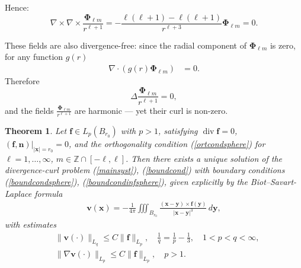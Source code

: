 \documentclass[a4paper]{article}
\newcommand{\Z}{\mathbb{Z}}
\newcommand{\bx}{\mathbf{x}}
\newcommand{\bff}{\mathbf{f}}
\newcommand{\divv}{\operatorname{div}}
\newcommand{\bv}{\mathbf{v}}
\newcommand{\by}{\mathbf{y}}
\newcommand{\bn}{\mathbf{n}}
\newtheorem{theorem}{Theorem}[section]
\begin{document}
Hence:
$$
\nabla \times \nabla \times \frac{\mathbf \Phi_{\ell m}}{r^{\ell+1}} = -\frac{\ell(\ell+1) - \ell(\ell+1)}{r^{\ell+3}}\mathbf \Phi_{\ell m}  = 0.
$$

These fields are also divergence-free: since the radial component of $\mathbf{\Phi}_{\ell m}$ is zero, for any function $g(r)$
\begin{align*}
\nabla \cdot \left(g(r){\mathbf\Phi } _{\ell m}\right)&=0.
\end{align*}
Therefore
$$
\Delta \frac{\mathbf \Phi_{\ell m}}{r^{\ell+1}} = 0,
$$
and the fields $\frac{\mathbf \Phi_{\ell m}}{r^{\ell+1}}$ are harmonic --- yet their curl is non-zero.

\begin{theorem}
Let $\bff \in L_p(B_{r_0})$ with $p>1$, satisfying $\divv \bff = 0$, $(\bff,\bn)\big|_{|\bx|=r_0} = 0$, and the orthogonality condition (\ref{ortcondsphere}) for $\ell=1,\ldots,\infty$, $m\in\Z \cap [-\ell,\ell]$. Then there exists a unique solution of the divergence-curl problem (\ref{mainsyst}), (\ref{boundcond}) with boundary conditions (\ref{boundcondsphere}), (\ref{boundcondinfsphere}), given explicitly by the Biot--Savart-Laplace formula
\begin{align} \label{BiotSavar3d}
\bv(\bx) = -\frac{1}{4\pi} \iiint_{B_{r_0}} \frac{(\bx-\by)\times \bff(\by)}{|\bx-\by|^3} \,d\mathbf{y},
\end{align}
with estimates
\begin{align}
&\|\bv(\cdot)\|_{L_q} \leq C   \| \bff \|_{L_p},\quad\frac 1q = \frac 1p - \frac 13,\quad 1<p<q<\infty, \label{est1} \\
&\|\nabla \bv(\cdot)\|_{L_p} \leq C \| \bff \|_{L_p},\quad p>1. \label{est2}
\end{align}
\end{theorem}
\end{document}
